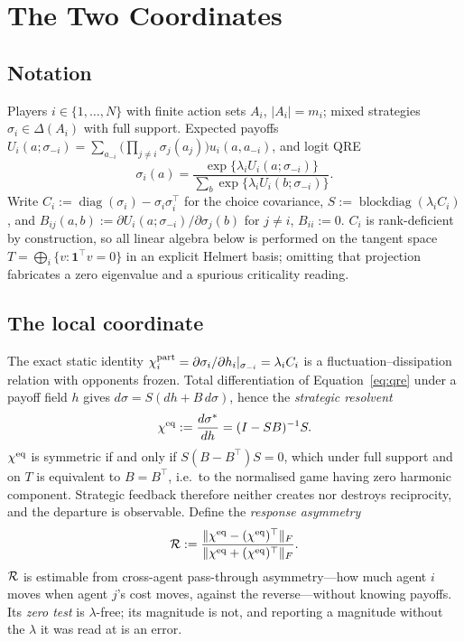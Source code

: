 \section{The Two Coordinates}
\label{sec:coordinates}

\subsection{Notation}
Players $i\in\{1,\dots,N\}$ with finite action sets $A_i$, $|A_i|=m_i$; mixed strategies
$\sigma_i\in\Delta(A_i)$ with full support. Expected payoffs
$U_i(a;\sigma_{-i})=\sum_{a_{-i}}\big(\prod_{j\ne i}\sigma_j(a_j)\big)u_i(a,a_{-i})$, and
logit QRE
\begin{equation}
\sigma_i(a)=\frac{\exp\{\lambda_i U_i(a;\sigma_{-i})\}}{\sum_{b}\exp\{\lambda_i U_i(b;\sigma_{-i})\}}.
\label{eq:qre}
\end{equation}
Write $C_i:=\operatorname{diag}(\sigma_i)-\sigma_i\sigma_i^{\top}$ for the choice
covariance, $S:=\operatorname{blockdiag}(\lambda_i C_i)$, and
$B_{ij}(a,b):=\partial U_i(a;\sigma_{-i})/\partial\sigma_j(b)$ for $j\ne i$, $B_{ii}:=0$.
$C_i$ is rank-deficient by construction, so all linear algebra below is performed on the
tangent space $T=\bigoplus_i\{v:\mathbf{1}^{\top}v=0\}$ in an explicit Helmert basis;
omitting that projection fabricates a zero eigenvalue and a spurious criticality reading.

\subsection{The local coordinate}
The exact static identity $\chi^{\mathrm{part}}_i=\partial\sigma_i/\partial h_i|_{\sigma_{-i}}=\lambda_i C_i$
is a fluctuation--dissipation relation with opponents frozen. Total differentiation of
Equation~\eqref{eq:qre} under a payoff field $h$ gives $d\sigma=S(dh+B\,d\sigma)$, hence the
\emph{strategic resolvent}
\begin{equation}
\chi^{\mathrm{eq}}:=\frac{d\sigma^*}{dh}=(I-SB)^{-1}S .
\label{eq:resolvent}
\end{equation}
$\chi^{\mathrm{eq}}$ is symmetric if and only if $S(B-B^{\top})S=0$, which under full support and on $T$
is equivalent to $B=B^{\top}$, i.e.\ to the normalised game having zero harmonic component.
Strategic feedback therefore neither creates nor destroys reciprocity, and the departure is
observable. Define the \emph{response asymmetry}
\begin{equation}
\mathcal{R}:=\frac{\|\chi^{\mathrm{eq}}-(\chi^{\mathrm{eq}})^{\top}\|_F}{\|\chi^{\mathrm{eq}}+(\chi^{\mathrm{eq}})^{\top}\|_F}.
\label{eq:R}
\end{equation}
$\mathcal{R}$ is estimable from cross-agent pass-through asymmetry---how much agent $i$ moves when
agent $j$'s cost moves, against the reverse---without knowing payoffs. Its \emph{zero test}
is $\lambda$-free; its magnitude is not, and reporting a magnitude without the $\lambda$ it
was read at is an error.

